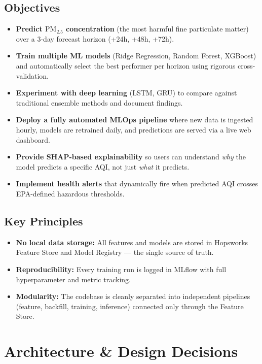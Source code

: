 \documentclass[11pt,a4paper]{article}
\begin{document}
\subsection{Objectives}
\begin{itemize}
    \item \textbf{Predict $\text{PM}_{2.5}$ concentration} (the most harmful fine particulate matter) over a 3-day forecast horizon (+24h, +48h, +72h).
    \item \textbf{Train multiple ML models} (Ridge Regression, Random Forest, XGBoost) and automatically select the best performer per horizon using rigorous cross-validation.
    \item \textbf{Experiment with deep learning} (LSTM, GRU) to compare against traditional ensemble methods and document findings.
    \item \textbf{Deploy a fully automated MLOps pipeline} where new data is ingested hourly, models are retrained daily, and predictions are served via a live web dashboard.
    \item \textbf{Provide SHAP-based explainability} so users can understand \textit{why} the model predicts a specific AQI, not just \textit{what} it predicts.
    \item \textbf{Implement health alerts} that dynamically fire when predicted AQI crosses EPA-defined hazardous thresholds.
\end{itemize}

\subsection{Key Principles}
\begin{itemize}
    \item \textbf{No local data storage:} All features and models are stored in Hopsworks Feature Store and Model Registry --- the single source of truth.
    \item \textbf{Reproducibility:} Every training run is logged in MLflow with full hyperparameter and metric tracking.
    \item \textbf{Modularity:} The codebase is cleanly separated into independent pipelines (feature, backfill, training, inference) connected only through the Feature Store.
\end{itemize}

\newpage
\section{Architecture \& Design Decisions}
\end{document}
